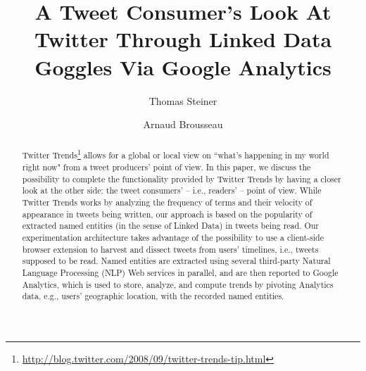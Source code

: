 \documentclass[runningheads,a4paper]{llncs}
\begin{document}
\mainmatter  %

\title{A Tweet Consumer's Look At Twitter Through Linked Data Goggles Via Google Analytics}


%
%
\author{Thomas Steiner \and Arnaud Brousseau}

%
%


\maketitle

\begin{abstract}
Twitter Trends\footnote{\url{http://blog.twitter.com/2008/09/twitter-trends-tip.html}} allows for a global or local view on ``what's happening in my world right now" from a tweet producers' point of view. In this paper, we discuss the possibility to complete the functionality provided by Twitter Trends by having a closer look at the other side: the tweet consumers' -- i.e., readers' -- point of view. While Twitter Trends works by analyzing the frequency of terms and their velocity of appearance in tweets being written, our approach is based on the popularity of extracted named entities (in the sense of Linked Data) in tweets being read. Our experimentation architecture takes advantage of the possibility to use a client-side browser extension to harvest and dissect tweets from users' timelines, i.e., tweets supposed to be read. Named entities are extracted using several third-party Natural Language Processing (NLP) Web services in parallel, and are then reported to Google Analytics, which is used to store, analyze, and compute trends by pivoting Analytics data, e.g., users' geographic location, with the recorded named entities.
\end{abstract}
\end{document}
